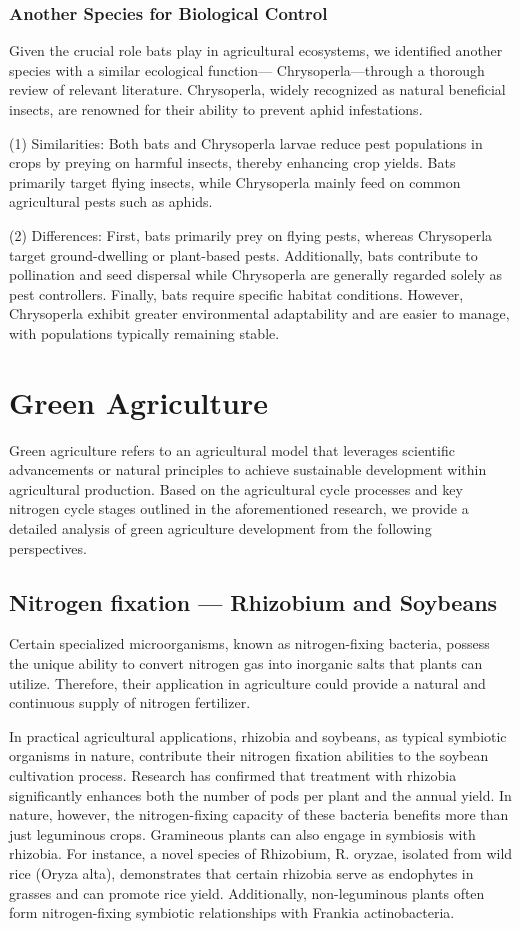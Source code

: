 \documentclass{mcmthesis}
\begin{document}
\subsubsection{Another Species for Biological Control}
Given the crucial role bats play in agricultural ecosystems, we identified another species with a similar ecological function— Chrysoperla—through a thorough review of relevant literature.  Chrysoperla, widely recognized as natural beneficial insects, are renowned for their ability to prevent aphid infestations\cite{Turquet2009BiologicalCO}.

(1) Similarities: Both bats and Chrysoperla larvae reduce pest populations in crops by preying on harmful insects, thereby enhancing crop yields. Bats primarily target flying insects, while Chrysoperla mainly feed on common agricultural pests such as aphids. 

(2) Differences: First, bats primarily prey on flying pests, whereas Chrysoperla target ground-dwelling or plant-based pests. Additionally, bats contribute to pollination and seed dispersal while Chrysoperla are generally regarded solely as pest controllers. Finally, bats require specific habitat conditions. However, Chrysoperla exhibit greater environmental adaptability and are easier to manage, with populations typically remaining stable.

\section{Green Agriculture}
Green agriculture refers to an agricultural model that leverages scientific advancements or natural principles to achieve sustainable development within agricultural production. Based on the agricultural cycle processes and key nitrogen cycle stages outlined in the aforementioned research, we provide a detailed analysis of green agriculture development from the following perspectives.

\subsection{Nitrogen fixation — Rhizobium and Soybeans}
Certain specialized microorganisms, known as nitrogen-fixing bacteria, possess the unique ability to convert nitrogen gas into inorganic salts that plants can utilize. Therefore, their application in agriculture could provide a natural and continuous supply of nitrogen fertilizer.

In practical agricultural applications, rhizobia and soybeans, as typical symbiotic organisms in nature, contribute their nitrogen fixation abilities to the soybean cultivation process. Research has confirmed that treatment with rhizobia significantly enhances both the number of pods per plant and the annual yield. In nature, however, the nitrogen-fixing capacity of these bacteria benefits more than just leguminous crops. Gramineous plants can also engage in symbiosis with rhizobia. For instance, a novel species of Rhizobium, R. oryzae, isolated from wild rice (Oryza alta), demonstrates that certain rhizobia serve as endophytes in grasses and can promote rice yield. Additionally, non-leguminous plants often form nitrogen-fixing symbiotic relationships with Frankia actinobacteria.\cite{genliujun}
\end{document}
